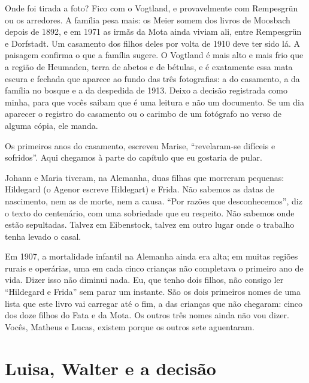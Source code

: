 \documentclass[
  brazilian,
  11pt,
  openany]{book}
\begin{document}
Onde foi tirada a foto? Fico com o Vogtland, e provavelmente com
Rempesgrün ou os arredores. A família pesa mais: os Meier somem dos
livros de Moosbach depois de 1892, e em 1971 as irmãs da Mota ainda
viviam ali, entre Rempesgrün e Dorfstadt. Um casamento dos filhos deles
por volta de 1910 deve ter sido lá. A paisagem confirma o que a família
sugere. O Vogtland é mais alto e mais frio que a região de Heumaden,
terra de abetos e de bétulas, e é exatamente essa mata escura e fechada
que aparece ao fundo das três fotografias: a do casamento, a da família
no bosque e a da despedida de 1913. Deixo a decisão registrada como
minha, para que vocês saibam que é uma leitura e não um documento. Se um
dia aparecer o registro do casamento ou o carimbo de um fotógrafo no
verso de alguma cópia, ele manda.

Os primeiros anos do casamento, escreveu Marise, ``revelaram-se difíceis
e sofridos''. Aqui chegamos à parte do capítulo que eu gostaria de
pular.

Johann e Maria tiveram, na Alemanha, duas filhas que morreram pequenas:
Hildegard (o Agenor escreve Hildegart) e Frida. Não sabemos as datas de
nascimento, nem as de morte, nem a causa. ``Por razões que
desconhecemos'', diz o texto do centenário, com uma sobriedade que eu
respeito. Não sabemos onde estão sepultadas. Talvez em Eibenstock,
talvez em outro lugar onde o trabalho tenha levado o casal.

Em 1907, a mortalidade infantil na Alemanha ainda era alta; em muitas
regiões rurais e operárias, uma em cada cinco crianças não completava o
primeiro ano de vida. Dizer isso não diminui nada. Eu, que tenho dois
filhos, não consigo ler ``Hildegard e Frida'' sem parar um instante. São
os dois primeiros nomes de uma lista que este livro vai carregar até o
fim, a das crianças que não chegaram: cinco dos doze filhos do Fata e da
Mota. Os outros três nomes ainda não vou dizer. Vocês, Matheus e Lucas,
existem porque os outros sete aguentaram.

\section{Luisa, Walter e a decisão}\label{luisa-walter-e-a-decisuxe3o}
\end{document}
